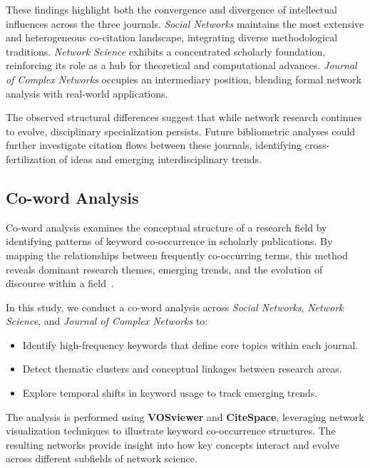 \documentclass[twocolumn]{article}
\begin{document}
		These findings highlight both the convergence and divergence of intellectual influences across the three journals. \textit{Social Networks} maintains the most extensive and heterogeneous co-citation landscape, integrating diverse methodological traditions. \textit{Network Science} exhibits a concentrated scholarly foundation, reinforcing its role as a hub for theoretical and computational advances. \textit{Journal of Complex Networks} occupies an intermediary position, blending formal network analysis with real-world applications.
		
		The observed structural differences suggest that while network research continues to evolve, disciplinary specialization persists. Future bibliometric analyses could further investigate citation flows between these journals, identifying cross-fertilization of ideas and emerging interdisciplinary trends.
		
		\subsection{Co-word Analysis}
		
		Co-word analysis examines the conceptual structure of a research field by identifying patterns of keyword co-occurrence in scholarly publications. By mapping the relationships between frequently co-occurring terms, this method reveals dominant research themes, emerging trends, and the evolution of discourse within a field~\cite{callon1983co, coulter1998co, ding2001co}.
		
		
		In this study, we conduct a co-word analysis across \textit{Social Networks}, \textit{Network Science}, and \textit{Journal of Complex Networks} to:
		
		\begin{itemize}
			\item Identify high-frequency keywords that define core topics within each journal.
			\item Detect thematic clusters and conceptual linkages between research areas.
			\item Explore temporal shifts in keyword usage to track emerging trends.
		\end{itemize}
		
		The analysis is performed using \textbf{VOSviewer} and \textbf{CiteSpace}, leveraging network visualization techniques to illustrate keyword co-occurrence structures. The resulting networks provide insight into how key concepts interact and evolve across different subfields of network science.
		
\end{document}
